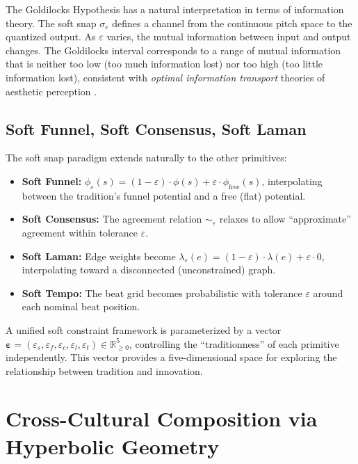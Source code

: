 \documentclass[cmj]{article}
\newcommand{\eps}{\varepsilon}
\newcommand{\R}{\mathbb{R}}
\begin{document}
The Goldilocks Hypothesis has a natural interpretation in terms of information
theory. The soft snap $\sigma_\eps$ defines a channel from the continuous
pitch space to the quantized output. As $\eps$ varies, the mutual information
between input and output changes. The Goldilocks interval corresponds to a
range of mutual information that is neither too low (too much information
lost) nor too high (too little information lost), consistent with
\emph{optimal information transport} theories of aesthetic perception
\citep{birkhoff1933aesthetic}.

\subsection{Soft Funnel, Soft Consensus, Soft Laman}

The soft snap paradigm extends naturally to the other primitives:

\begin{itemize}[nosep]
  \item \textbf{Soft Funnel:} $\phi_\eps(s) = (1 - \eps) \cdot \phi(s) + \eps
    \cdot \phi_{\mathrm{free}}(s)$, interpolating between the tradition's
    funnel potential and a free (flat) potential.
  \item \textbf{Soft Consensus:} The agreement relation $\sim_\eps$ relaxes
    to allow ``approximate'' agreement within tolerance $\eps$.
  \item \textbf{Soft Laman:} Edge weights become $\lambda_\eps(e) = (1-\eps)
    \cdot \lambda(e) + \eps \cdot 0$, interpolating toward a disconnected
    (unconstrained) graph.
  \item \textbf{Soft Tempo:} The beat grid becomes probabilistic with
    tolerance $\eps$ around each nominal beat position.
\end{itemize}

A unified soft constraint framework is parameterized by a vector
$\boldsymbol{\eps} = (\eps_s, \eps_f, \eps_c, \eps_l, \eps_t) \in \R_{\geq
0}^5$, controlling the ``traditionness'' of each primitive independently.
This vector provides a five-dimensional space for exploring the relationship
between tradition and innovation.

\section{Cross-Cultural Composition via Hyperbolic Geometry}
\label{sec:hyperbolic}
\end{document}
